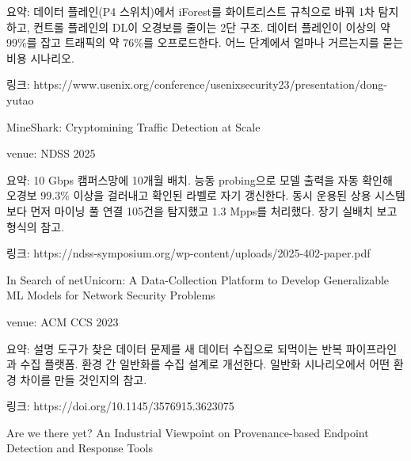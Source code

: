 \par\noindent \textbullet\enspace 요약: 데이터 플레인(P4 스위치)에서 iForest를 화이트리스트 규칙으로 바꿔 1차 탐지하고, 컨트롤 플레인의 DL이 오경보를 줄이는 2단 구조. 데이터 플레인이 이상의 약 99\%를 잡고 트래픽의 약 76\%를 오프로드한다. 어느 단계에서 얼마나 거르는지를 묻는 비용 시나리오.


\par\noindent \textbullet\enspace 링크: https:/\allowbreak{}/\allowbreak{}www.usenix.org/\allowbreak{}conference/\allowbreak{}usenixsecurity23/\allowbreak{}presentation/\allowbreak{}dong-yutao


\par\noindent \textbullet\enspace MineShark: Cryptomining Traffic Detection at Scale


\par\noindent \textbullet\enspace venue: NDSS 2025


\par\noindent \textbullet\enspace 요약: 10 Gbps 캠퍼스망에 10개월 배치. 능동 probing으로 모델 출력을 자동 확인해 오경보 99.3\% 이상을 걸러내고 확인된 라벨로 자기 갱신한다. 동시 운용된 상용 시스템보다 먼저 마이닝 풀 연결 105건을 탐지했고 1.3 Mpps를 처리했다. 장기 실배치 보고 형식의 참고.


\par\noindent \textbullet\enspace 링크: https:/\allowbreak{}/\allowbreak{}ndss-symposium.org/\allowbreak{}wp-content/\allowbreak{}uploads/\allowbreak{}2025-402-paper.pdf


\par\noindent \textbullet\enspace In Search of netUnicorn: A Data-Collection Platform to Develop Generalizable ML Models for Network Security Problems


\par\noindent \textbullet\enspace venue: ACM CCS 2023


\par\noindent \textbullet\enspace 요약: 설명 도구가 찾은 데이터 문제를 새 데이터 수집으로 되먹이는 반복 파이프라인과 수집 플랫폼. 환경 간 일반화를 수집 설계로 개선한다. 일반화 시나리오에서 어떤 환경 차이를 만들 것인지의 참고.


\par\noindent \textbullet\enspace 링크: https:/\allowbreak{}/\allowbreak{}doi.org/\allowbreak{}10.1145/\allowbreak{}3576915.3623075


\par\noindent \textbullet\enspace Are we there yet? An Industrial Viewpoint on Provenance-based Endpoint Detection and Response Tools


